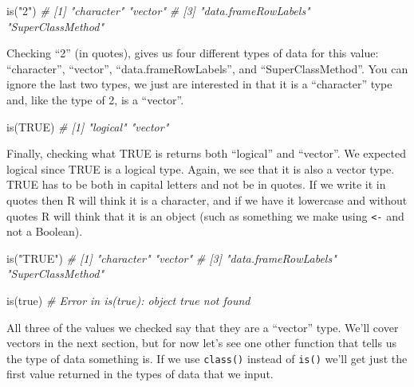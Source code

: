 \documentclass[
  a4paper,
]{krantz}
\makeatletter
\newenvironment{Shaded}{\begin{snugshade}}{\end{snugshade}}
\newcommand{\CommentTok}[1]{\textcolor[rgb]{0.56,0.35,0.01}{\textit{#1}}}
\newcommand{\ConstantTok}[1]{\textcolor[rgb]{0.00,0.00,0.00}{#1}}
\newcommand{\FunctionTok}[1]{\textcolor[rgb]{0.00,0.00,0.00}{#1}}
\newcommand{\NormalTok}[1]{#1}
\newcommand{\StringTok}[1]{\textcolor[rgb]{0.31,0.60,0.02}{#1}}
\newenvironment{kframe}{%
\medskip{}
\setlength{\fboxsep}{.8em}
 \def\at@end@of@kframe{}%
 \ifinner\ifhmode%
  \def\at@end@of@kframe{\end{minipage}}%
  \begin{minipage}{\columnwidth}%
 \fi\fi%
 \def\FrameCommand##1{\hskip\@totalleftmargin \hskip-\fboxsep
 \colorbox{shadecolor}{##1}\hskip-\fboxsep
     \hskip-\linewidth \hskip-\@totalleftmargin \hskip\columnwidth}%
 \MakeFramed {\advance\hsize-\width
   \@totalleftmargin\z@ \linewidth\hsize
   \@setminipage}}%
 {\par\unskip\endMakeFramed%
 \at@end@of@kframe}
\renewenvironment{Shaded}{\begin{kframe}}{\end{kframe}}
\makeatother
\begin{document}
\begin{Shaded}
\begin{Highlighting}[]
\FunctionTok{is}\NormalTok{(}\StringTok{"2"}\NormalTok{)}
\CommentTok{\# [1] "character"           "vector"             }
\CommentTok{\# [3] "data.frameRowLabels" "SuperClassMethod"}
\end{Highlighting}
\end{Shaded}

Checking ``2'' (in quotes), gives us four different types of
data for this value: ``character'', ``vector'',
``data.frameRowLabels'', and ``SuperClassMethod''. You can
ignore the last two types, we just are interested in that it
is a ``character'' type and, like the type of 2, is a
``vector''.

\begin{Shaded}
\begin{Highlighting}[]
\FunctionTok{is}\NormalTok{(}\ConstantTok{TRUE}\NormalTok{)}
\CommentTok{\# [1] "logical" "vector"}
\end{Highlighting}
\end{Shaded}

Finally, checking what TRUE is returns both ``logical'' and
``vector''. We expected logical since TRUE is a logical
type. Again, we see that it is also a vector type. TRUE has
to be both in capital letters and not be in quotes. If we
write it in quotes then R will think it is a character, and
if we have it lowercase and without quotes R will think that
it is an object (such as something we make using
\texttt{\textless{}-} and not a Boolean).

\begin{Shaded}
\begin{Highlighting}[]
\FunctionTok{is}\NormalTok{(}\StringTok{"TRUE"}\NormalTok{)}
\CommentTok{\# [1] "character"           "vector"             }
\CommentTok{\# [3] "data.frameRowLabels" "SuperClassMethod"}
\end{Highlighting}
\end{Shaded}

\begin{Shaded}
\begin{Highlighting}[]
\FunctionTok{is}\NormalTok{(true)}
\CommentTok{\# Error in is(true): object \textquotesingle{}true\textquotesingle{} not found}
\end{Highlighting}
\end{Shaded}

All three of the values we checked say that they are a
``vector'' type. We'll cover vectors in the next section,
but for now let's see one other function that tells us the
type of data something is. If we use \texttt{class()}
instead of \texttt{is()} we'll get just the first value
returned in the types of data that we input.
\end{document}
